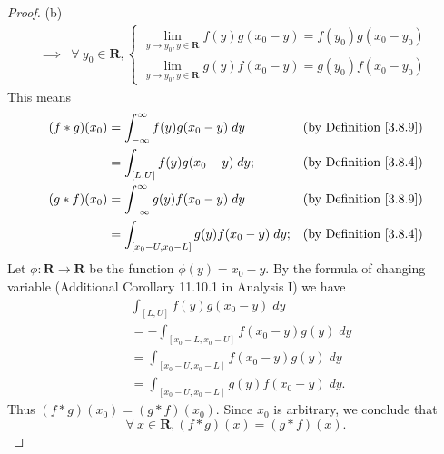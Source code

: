\begin{proof}{(b)}
\begin{align*}
        \implies & \forall\ y_0 \in \mathbf{R}, \begin{cases}
            \lim_{y \to y_0 ; y \in \mathbf{R}} f(y) g(x_0 - y) = f(y_0) g(x_0 - y_0) \\
            \lim_{y \to y_0 ; y \in \mathbf{R}} g(y) f(x_0 - y) = g(y_0) f(x_0 - y_0)
        \end{cases}
    \end{align*}
    This means
    \begin{align*}
        (f * g)(x_0) & = \int_{-\infty}^\infty f(y) g(x_0 - y) \; dy      & \text{(by Definition \ref{3.8.9})} \\
                     & = \int_{[L, U]} f(y) g(x_0 - y) \; dy;             & \text{(by Definition \ref{3.8.4})} \\
        (g * f)(x_0) & = \int_{-\infty}^\infty g(y) f(x_0 - y) \; dy      & \text{(by Definition \ref{3.8.9})} \\
                     & = \int_{[x_0 - U, x_0 - L]} g(y) f(x_0 - y) \; dy; & \text{(by Definition \ref{3.8.4})}
    \end{align*}
    Let \(\phi : \mathbf{R} \to \mathbf{R}\) be the function \(\phi(y) = x_0 - y\).
    By the formula of changing variable (Additional Corollary 11.10.1 in Analysis I) we have
    \begin{align*}
         & \int_{[L, U]} f(y) g(x_0 - y) \; dy                \\
         & = -\int_{[x_0 - L, x_0 - U]} f(x_0 - y) g(y) \; dy \\
         & = \int_{[x_0 - U, x_0 - L]} f(x_0 - y) g(y) \; dy  \\
         & = \int_{[x_0 - U, x_0 - L]} g(y) f(x_0 - y) \; dy.
    \end{align*}
    Thus \((f * g)(x_0) = (g * f)(x_0)\).
    Since \(x_0\) is arbitrary, we conclude that
    \[
        \forall\ x \in \mathbf{R}, (f * g)(x) = (g * f)(x).
    \]
\end{proof}

